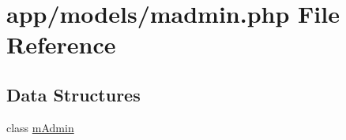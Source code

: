 \hypertarget{madmin_8php}{}\section{app/models/madmin.php File Reference}
\label{madmin_8php}
\subsection*{Data Structures}
\begin{DoxyCompactItemize}
\item 
class \hyperlink{classmAdmin}{m\+Admin}
\end{DoxyCompactItemize}
